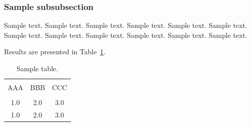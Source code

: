 \documentclass[jou,apacite]{apa6}
\begin{document}
\subsubsection{Sample subsubsection}
Sample text. Sample text. Sample text. Sample text. Sample text. Sample text. 
Sample text. Sample text. Sample text. Sample text. Sample text. Sample text. 


Results are presented in Table~\ref{tab1}.
\begin{table}[!htb]
\caption{Sample table.}\label{tab1}
\begin{tabular}{ccc}
\hline\\[-1.5ex]
AAA & BBB & CCC \\[0.5ex]
\hline\\[-1.5ex]
1.0 & 2.0 & 3.0\\[0.5ex]
1.0 & 2.0 & 3.0\\[0.5ex]
\hline
\end{tabular}
\end{table}



\end{document}
